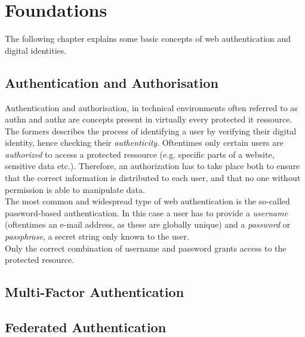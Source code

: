 
\section{Foundations}
\label{sec:foundations}

The following chapter explains some basic concepts of web authentication and digital identities.

\subsection{Authentication and Authorisation}
\label{subsec:authn_authz}

Authentication and authorisation, in technical environments often referred to as \ac{authn} and \ac{authz} are concepts present in virtually every protected \ac{it} ressource.\\
The formers describes the process of identifying a user by verifying their digital identity, hence checking their \emph{authenticity}. Oftentimes only certain users are \emph{authorized} to access a protected ressource (e.g. specific parts of a website, sensitive data etc.). Therefore, an authorization has to take place both to ensure that the correct information is distributed to each user, and that no one without permission is able to manipulate data.\\
The most common and widespread type of web authentication is the so-called password-based authentication. In this case a user has to provide a \emph{username} (oftentimes an e-mail address, as these are globally unique) and a \emph{password} or \emph{passphrase}, a secret string only known to the user.\\
Only the correct combination of username and password grants access to the protected resource.

\subsection{Multi-Factor Authentication}
\label{subsec:mfa}



\subsection{Federated Authentication}
\label{subsec:fed_auth}

